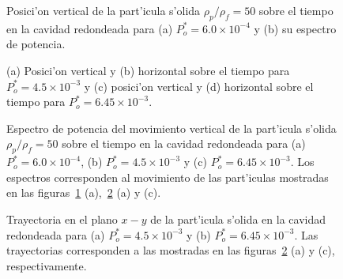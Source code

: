 \begin{figure} 


\caption{\label{fig:paths-rho-30-rounded}
Posici'on vertical de la part'icula s'olida $\rho_p/\rho_f=50$ sobre el tiempo en la cavidad redondeada para
(a) $P_o^\ast = 6.0\times 10^{-4} $ y (b) su espectro de potencia.
}
\end{figure}

\begin{figure}




\caption{\label{fig:paths-rho-30-rounded-b}
(a) Posici'on vertical y 
(b) horizontal sobre el tiempo para  $P_o^\ast = 4.5\times 10^{-3}$
y
(c) posici'on vertical y 
(d) horizontal sobre el tiempo para  $P_o^\ast = 6.45\times 10^{-3}$.
}
\end{figure}

\begin{figure} 

%


\caption{\label{fig:paths-rho-30-rounded-spectrum}
Espectro de potencia del movimiento vertical de la part'icula s'olida $\rho_p/\rho_f=50$ sobre el tiempo en la cavidad redondeada para
(a) $P_o^\ast = 6.0\times 10^{-4} $,
(b) $P_o^\ast = 4.5\times 10^{-3}$
y
(c) $P_o^\ast = 6.45\times 10^{-3}$. Los espectros corresponden al movimiento de las part'iculas mostradas en las 
figuras~\ref{fig:paths-rho-30-rounded} (a),~\ref{fig:paths-rho-30-rounded-b} (a) y (c).
}
\end{figure}
%
\begin{figure} 


\caption{\label{fig:paths-rho-30-rounded-x-y} 
Trayectoria en el plano $x-y$ de la part'icula s'olida en la cavidad redondeada  para
(a) $P_o^\ast = 4.5\times 10^{-3}$
y
(b) $P_o^\ast = 6.45\times 10^{-3}$. Las trayectorias corresponden a las mostradas en las 
figuras~\ref{fig:paths-rho-30-rounded-b} (a) y (c), respectivamente.
}
\end{figure}


